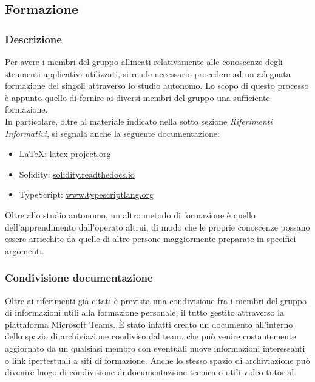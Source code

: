 \subsection{Formazione}
		\subsubsection{Descrizione}	
		Per avere i membri del gruppo \Gruppo{} allineati relativamente alle conoscenze degli strumenti applicativi utilizzati, si rende necessario procedere ad un adeguata formazione dei singoli attraverso lo studio autonomo. Lo scopo di questo processo è appunto quello di fornire ai diversi membri del gruppo una sufficiente formazione.\\
		In particolare, oltre al materiale indicato nella sotto sezione \textit{Riferimenti Informativi}, si segnala anche la seguente documentazione:
		\begin{itemize}
			\item \LaTeX{}: \href{latex-project.org}{latex-project.org}
			\item Solidity: \href{solidity.readthedocs.io}{solidity.readthedocs.io}
			\item TypeScript: \href{www.typescriptlang.org}{www.typescriptlang.org}
		\end{itemize}
		Oltre allo studio autonomo, un altro metodo di formazione è quello dell'apprendimento dall'operato altrui, di modo che le proprie conoscenze possano essere arricchite da quelle di altre persone maggiormente preparate in specifici argomenti.
		
		\subsubsection{Condivisione documentazione}
		Oltre ai riferimenti già citati è prevista una condivisione fra i membri del gruppo di informazioni utili alla formazione personale, il tutto gestito attraverso la piattaforma Microsoft Teams. È stato infatti creato un documento all'interno dello spazio di archiviazione condiviso dal team, che può venire costantemente aggiornato da un qualsiasi membro con eventuali nuove informazioni interessanti o link ipertestuali a siti di formazione. Anche lo stesso spazio di archiviazione può divenire luogo di condivisione di documentazione tecnica o utili video-tutorial.
